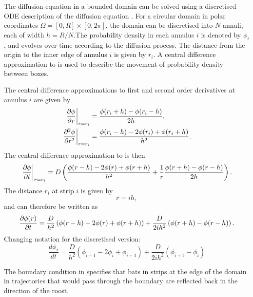 The diffusion equation in a bounded domain can be solved using a discretised ODE
description of the diffusion equation \cite{woolley2011stochastic}. For a circular domain in polar coordinates $\Omega = [0,R] \times [0, 2\pi]$, the domain can be discretised into $N$ annuli, each of
width $h=R/N$.The probability density in each annulus $i$ is denoted by $\phi_i$, and evolves over time according to the diffusion process.  The distance from the origin to the inner edge of annulus $i$ is given by $r_i$.  A central difference approximation to  is used to describe the movement of probability density between boxes.

The central difference approximations to first and second order derivatives at annulus $i$ are given by
%
\begin{align}
 \left.\frac{\partial \phi}{\partial r}\right|_{r=r_i}&= \frac{\phi(r_i+h)-\phi(r_i-h)}{2 h} ,\label{eqn:diffusion_discrete1} \\
 \left.\frac{\partial^2 \phi}{\partial r^2}\right|_{r=r_i}&= \frac{\phi(r_i-h)-2\phi(r_i)+\phi(r_i+h)}{h^2} .\label{eqn:diffusion_discretei}
\end{align}
%
The central difference approximation to  is then
%
\begin{equation}
 \left.\frac{\partial \phi}{\partial t}\right|_{r=r_i} = D \left(\frac{\phi(r-h)-2\phi(r)+\phi(r+h)}{h^2} + \frac{1}{r} \frac{\phi(r+h)-\phi(r-h)}{2 h} \right).
 \label{eqn:diffusion_polar_cd}
\end{equation}
%
The distance $r_i$ at strip $i$ is given by
\begin{equation}
r = i h ,
\end{equation}
%
and  can therefore be written as
%
\begin{equation}
\frac{\partial \phi(r)}{\partial t} = \frac{D}{h^2} \left(\phi(r-h)-2\phi(r)+\phi(r+h)\right) + \frac{D}{2ih^2}\left(\phi(r+h)-\phi(r-h) \right).
\label{eqn:diffusion_polar_final}
\end{equation}
%
Changing notation for the discretised version:
%
\begin{equation}
\frac{d\phi_i}{dt} = \frac{D}{h^2}(\phi_{i-1}-2\phi_i +\phi_{i+1}) + \frac{D}{2ih^2} (\phi_{i+1}-\phi_{i})
        \label{eqn:discrete_diffusion_i}
\end{equation}

The boundary condition in  specifies that bats in strips at the edge of the domain in trajectories that would pass through the boundary are reflected back in the direction of the roost.


